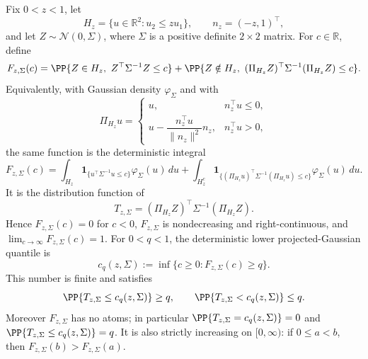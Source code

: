 \iffalse %
\begin{lemma}\label{lem:deterministic-full-rank-projected-gaussian-quantile-main}
Fix \(0<z<1\), let
\[
H_z=\{u\in\mathbb R^2:u_2\le zu_1\},\qquad
n_z=(-z,1)^\top,
\]
and let \(Z\sim\mathcal N(0,\Sigma)\), where \(\Sigma\) is a positive
definite \(2\times2\) matrix.  For \(c\in\mathbb R\), define
\[
F_{z,\Sigma}(c)=
\PP\{Z\in H_z,\ Z^\top\Sigma^{-1}Z\le c\}
+\PP\{Z\notin H_z,\ 
(\Pi_{H_z}Z)^\top\Sigma^{-1}(\Pi_{H_z}Z)\le c\}.
\]
Equivalently, with Gaussian density \(\varphi_\Sigma\) and with
\[
\Pi_{H_z}u=
\begin{cases}
u,&n_z^\top u\le0,\\[0.2em]
u-\dfrac{n_z^\top u}{\|n_z\|^2}n_z,&n_z^\top u>0,
\end{cases}
\]
the same function is the deterministic integral
\[
F_{z,\Sigma}(c)
=\int_{H_z}
\mathbf1_{\{u^\top\Sigma^{-1}u\le c\}}\varphi_\Sigma(u)\,du
+\int_{H_z^c}
\mathbf1_{\{(\Pi_{H_z}u)^\top\Sigma^{-1}(\Pi_{H_z}u)\le c\}}
\varphi_\Sigma(u)\,du .
\]
It is the distribution function of
\[
T_{z,\Sigma}=(\Pi_{H_z}Z)^\top\Sigma^{-1}(\Pi_{H_z}Z).
\]
Hence \(F_{z,\Sigma}(c)=0\) for \(c<0\), \(F_{z,\Sigma}\) is nondecreasing
and right-continuous, and \(\lim_{c\to\infty}F_{z,\Sigma}(c)=1\).  For
\(0<q<1\), the deterministic lower projected-Gaussian quantile is
\[
c_q(z,\Sigma):=\inf\{c\ge0:F_{z,\Sigma}(c)\ge q\}.
\]
This number is finite and satisfies
\[
\PP\{T_{z,\Sigma}\le c_q(z,\Sigma)\}\ge q,\qquad
\PP\{T_{z,\Sigma}<c_q(z,\Sigma)\}\le q.
\]
Moreover \(F_{z,\Sigma}\) has no atoms; in particular
\(\PP\{T_{z,\Sigma}=c_q(z,\Sigma)\}=0\) and
\(\PP\{T_{z,\Sigma}\le c_q(z,\Sigma)\}=q\).  It is also strictly
increasing on \([0,\infty)\): if \(0\le a<b\), then
\(F_{z,\Sigma}(b)>F_{z,\Sigma}(a)\).
\end{lemma}

